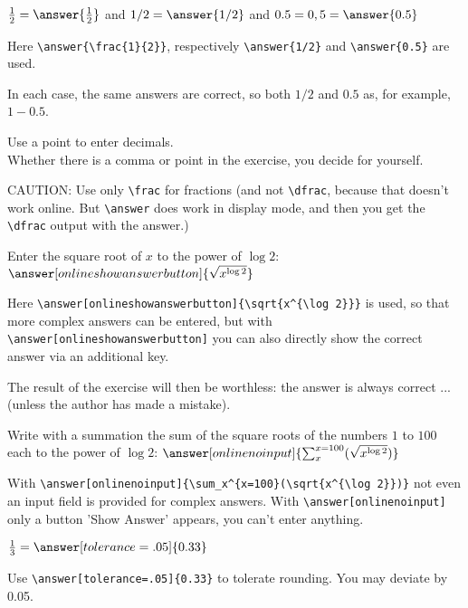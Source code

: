 \documentclass{ximera}
\begin{document}
\begin{exercise}
    \begin{question}
         $\frac{1}{2} =  \answer{\frac{1}{2}}$  and $1/2=\answer{1/2}$ and $0.5 = 0,5 =\answer{0.5}$

         Here \verb|\answer{\frac{1}{2}}|,  respectively \verb|\answer{1/2}| and \verb|\answer{0.5}| are used.

         In each case, the same answers are correct, so both $1/2$ and $0.5$ as, for example, $1-0.5$.

         Use a point to enter decimals. 
         \\
         Whether there is a comma or point in the exercise, you decide for yourself.

         CAUTION: Use only \verb|\frac| for fractions (and not \verb|\dfrac|, because that doesn't work online. But \verb|\answer| does work in display mode, and then you get the \verb|\dfrac| output with the answer.) 
    \end{question}

    \begin{question}
        Enter the square root of $x$ to the power of $\log 2$:   $\answer[onlineshowanswerbutton]{\sqrt{x^{\log 2}}}$

       Here \verb|\answer[onlineshowanswerbutton]{\sqrt{x^{\log 2}}}| is used, so that more complex answers can be entered, but with \verb|\answer[onlineshowanswerbutton]| you can also directly show the correct answer via an additional key. 

       The result of the exercise will then be worthless: the answer is always correct ... (unless the author has made a mistake).
    \end{question}

	\begin{question}
        Write with a summation the sum of the square roots of the numbers $1$ to $100$ each to the power of $\log 2$: $\answer[onlinenoinput]{\sum_x^{x=100}(\sqrt{x^{\log 2}})}$

        With \verb|\answer[onlinenoinput]{\sum_x^{x=100}(\sqrt{x^{\log 2}})}| not even an input field is provided for complex answers. 
        With \verb|\answer[onlinenoinput]| only a button 'Show Answer' appears, you can't enter anything.

    \end{question}

    \begin{question}
        $\frac{1}{3} =  \answer[tolerance=.05]{0.33}$  

        Use \verb|\answer[tolerance=.05]{0.33}| to tolerate rounding. You may deviate by 0.05.
    \end{question}
\end{exercise}
\end{document}
